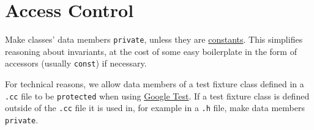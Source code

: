 
\section{Access Control}\label{sec:access-control}
Make classes' data members \texttt{private}, unless they are \hyperref[subsec:constant-names]{constants}. This simplifies reasoning about invariants, at the cost of some easy boilerplate in the form of accessors (usually \texttt{const}) if necessary.

For technical reasons, we allow data members of a test fixture class defined in a \texttt{.cc} file to be \texttt{protected} when using \href{https://github.com/google/googletest}{Google Test}. If a test fixture class is defined outside of the \texttt{.cc} file it is used in, for example in a \texttt{.h} file, make data members \texttt{private}.
